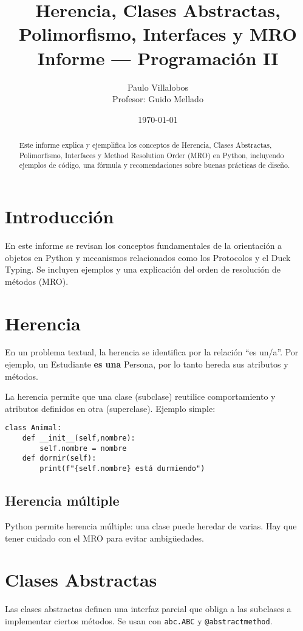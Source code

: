 \documentclass[12pt]{article}
\title{Herencia, Clases Abstractas, Polimorfismo, Interfaces y MRO\\
\large Informe — Programación II}
\author{Paulo Villalobos \\ Profesor: Guido Mellado}
\date{\today}
\begin{document}
\maketitle

\begin{abstract}
Este informe explica y ejemplifica los conceptos de Herencia, Clases Abstractas,
Polimorfismo, Interfaces y Method Resolution Order (MRO) en Python, incluyendo
ejemplos de código, una fórmula y recomendaciones sobre buenas prácticas de diseño.
\end{abstract}

\tableofcontents
\newpage

\section{Introducción}
En este informe se revisan los conceptos fundamentales de la orientación a objetos
en Python y mecanismos relacionados como los Protocolos y el Duck Typing. Se incluyen
ejemplos y una explicación del orden de resolución de métodos (MRO).

\section{Herencia}
En un problema textual, la herencia se identifica por la relación “es un/a”. 
Por ejemplo, un Estudiante \textbf{es una} Persona, por lo tanto hereda sus atributos y métodos.

La herencia permite que una clase (subclase) reutilice comportamiento y atributos
definidos en otra (superclase). Ejemplo simple:

\begin{verbatim}
class Animal:
    def __init__(self,nombre):
        self.nombre = nombre
    def dormir(self):
        print(f"{self.nombre} está durmiendo")
\end{verbatim}

\subsection{Herencia múltiple}
Python permite herencia múltiple: una clase puede heredar de varias. Hay que
tener cuidado con el MRO para evitar ambigüedades.

\section{Clases Abstractas}
Las clases abstractas definen una interfaz parcial que obliga a las subclases a
implementar ciertos métodos. Se usan con \texttt{abc.ABC} y \texttt{@abstractmethod}.
\end{document}
